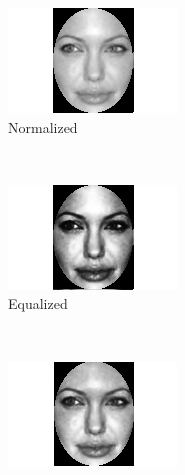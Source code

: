 \documentclass{llncs}
\begin{document}
\begin{figure}[t]
        \begin{subfigure}[b]{0.2\textwidth}
                \centering
                \includegraphics[width=\textwidth]{angelina/Angelina_Jolie_0006_normalized}
                \caption{Normalized}
                \label{fig:normalized} 
        \end{subfigure}
        ~ ~
        \begin{subfigure}[b]{0.2\textwidth}
                \centering
                \includegraphics[width=\textwidth]{angelina/Angelina_Jolie_0006_equalized}
                \caption{Equalized}
                \label{fig:equalized}
        \end{subfigure}
        ~ ~
        \begin{subfigure}[b]{0.2\textwidth}
                \centering
                \includegraphics[width=\textwidth]{angelina/Angelina_Jolie_0006_CLAHE}

\end{subfigure}
\end{figure}
\end{document}
